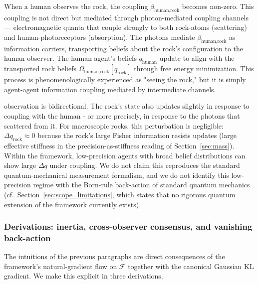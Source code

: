 \documentclass[11pt]{article}
\begin{document}
When a human observes the rock, the coupling $\beta_{\text{human,rock}}$ becomes non-zero. This coupling is not direct but mediated through photon-mediated coupling channels — electromagnetic quanta that couple strongly to both rock-atoms (scattering) and human-photoreceptors (absorption). The photons mediate $\beta_{\text{human,rock}}$ as information carriers, transporting beliefs about the rock's configuration to the human observer. The human agent's beliefs $q_{\text{human}}$ update to align with the transported rock beliefs $\Omega_{\text{human,rock}}[q_{\text{rock}}]$ through free energy minimization. This process is phenomenologically experienced as "seeing the rock," but it is simply agent-agent information coupling mediated by intermediate channels.

observation is bidirectional. The rock's state also updates slightly in response to coupling with the human - or more precisely, in response to the photons that scattered from it. For macroscopic rocks, this perturbation is negligible: $\Delta q_{\text{rock}} \approx 0$ because the rock's large Fisher information resists updates (large effective stiffness in the precision-as-stiffness reading of Section~\ref{sec:mass}). Within the framework, low-precision agents with broad belief distributions can show large $\Delta q$ under coupling. We do not claim this reproduces the standard quantum-mechanical measurement formalism, and we do not identify this low-precision regime with the Born-rule back-action of standard quantum mechanics (cf.\ Section~\ref{sec:scope_limitations}, which states that no rigorous quantum extension of the framework currently exists).

\subsubsection{Derivations: inertia, cross-observer consensus, and vanishing back-action}
\label{sec:rock_derivations}

The intuitions of the previous paragraphs are direct consequences of the framework's natural-gradient flow on $\mathcal{F}$ together with the canonical Gaussian KL gradient. We make this explicit in three derivations.
\end{document}
